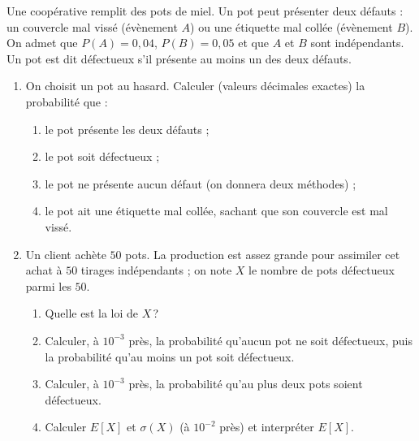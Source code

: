 \begin{exo}\label{exo:proba-22}
Une coop\'erative remplit des pots de miel. Un pot peut pr\'esenter deux d\'efauts :
un couvercle mal viss\'e (\'ev\`enement $A$) ou une \'etiquette mal coll\'ee (\'ev\`enement $B$).
On admet que $P(A) = 0,04$, $P(B) = 0,05$ et que $A$ et $B$ sont ind\'ependants.
Un pot est dit d\'efectueux s'il pr\'esente au moins un des deux d\'efauts.
\begin{enumerate}
\item On choisit un pot au hasard. Calculer (valeurs d\'ecimales exactes) la probabilit\'e que :
      \begin{enumerate}
      \item le pot pr\'esente les deux d\'efauts ;
      \item le pot soit d\'efectueux ;
      \item le pot ne pr\'esente aucun d\'efaut (on donnera deux m\'ethodes) ;
      \item le pot ait une \'etiquette mal coll\'ee, sachant que son couvercle est mal viss\'e.
      \end{enumerate}
\item Un client ach\`ete $50$ pots. La production est assez grande pour assimiler cet achat \`a $50$ tirages
      ind\'ependants ; on note $X$ le nombre de pots d\'efectueux parmi les $50$.
      \begin{enumerate}
      \item Quelle est la loi de $X$\,?
      \item Calculer, \`a $10^{-3}$ pr\`es, la probabilit\'e qu'aucun pot ne soit d\'efectueux,
            puis la probabilit\'e qu'au moins un pot soit d\'efectueux.
      \item Calculer, \`a $10^{-3}$ pr\`es, la probabilit\'e qu'au plus deux pots soient d\'efectueux.
      \item Calculer $E[X]$ et $\sigma(X)$ (\`a $10^{-2}$ pr\`es) et interpr\'eter $E[X]$.
      \end{enumerate}
\end{enumerate}
\end{exo}
%
